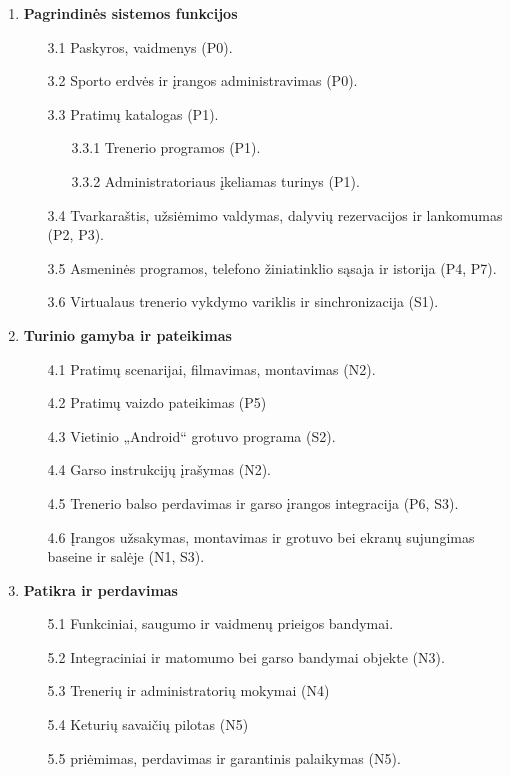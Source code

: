 \begin{enumerate}
\begin{enumerate}
  \end{enumerate}
\item \textbf{Pagrindinės sistemos funkcijos}
  \begin{enumerate}
  \item[3.1] Paskyros, vaidmenys (P0).
   \item[3.2] Sporto erdvės ir įrangos administravimas (P0).
  \item[3.3] Pratimų katalogas (P1).
  \begin{enumerate}
      \item[3.3.1] Trenerio programos (P1). 
      \item[3.3.2] Administratoriaus įkeliamas turinys (P1).
  \end{enumerate}
  \item[3.4] Tvarkaraštis, užsiėmimo valdymas, dalyvių rezervacijos ir lankomumas (P2, P3).
  \item[3.5] Asmeninės programos, telefono žiniatinklio sąsaja ir istorija (P4, P7).
   \item[3.6] Virtualaus trenerio vykdymo variklis ir sinchronizacija (S1).
  \end{enumerate}
\item \textbf{Turinio gamyba ir pateikimas}
  \begin{enumerate}
  \item[4.1] Pratimų scenarijai, filmavimas, montavimas (N2).
  \item[4.2] Pratimų vaizdo pateikimas (P5)
  \item[4.3] Vietinio „Android“ grotuvo programa (S2).
  \item[4.4] Garso instrukcijų įrašymas (N2).
  \item[4.5] Trenerio balso perdavimas ir garso įrangos integracija (P6, S3).
  \item[4.6] Įrangos užsakymas, montavimas ir grotuvo bei ekranų sujungimas baseine ir salėje (N1, S3).
  \end{enumerate}
\item \textbf{Patikra ir perdavimas}
  \begin{enumerate}
  \item[5.1] Funkciniai, saugumo ir vaidmenų prieigos bandymai.
  \item[5.2] Integraciniai ir matomumo bei garso bandymai objekte (N3).
  \item[5.3] Trenerių ir administratorių mokymai (N4)
  \item[5.4] Keturių savaičių pilotas (N5) 
  \item[5.5] priėmimas, perdavimas ir garantinis palaikymas (N5).
  \end{enumerate}
\end{enumerate}
